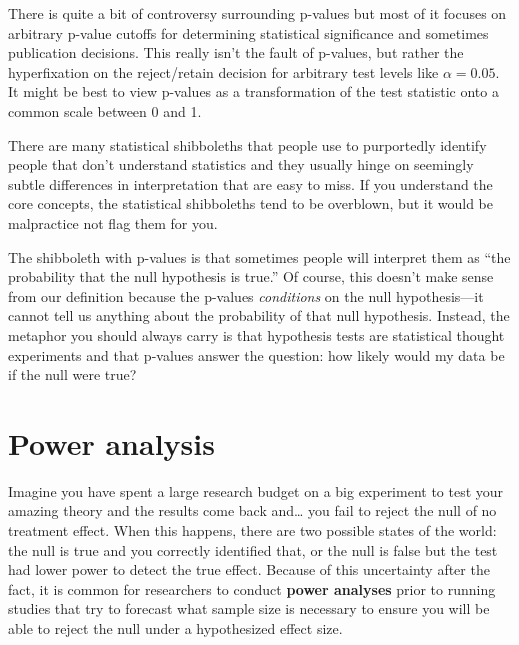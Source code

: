 \documentclass[
  letterpaper,
  DIV=11,
  numbers=noendperiod]{scrreprt}
\theoremstyle{definition}
\theoremstyle{plain}
\theoremstyle{definition}
\theoremstyle{remark}
\begin{document}
There is quite a bit of controversy surrounding p-values but most of it
focuses on arbitrary p-value cutoffs for determining statistical
significance and sometimes publication decisions. This really isn't the
fault of p-values, but rather the hyperfixation on the reject/retain
decision for arbitrary test levels like \(\alpha = 0.05\). It might be
best to view p-values as a transformation of the test statistic onto a
common scale between 0 and 1.

\begin{tcolorbox}[enhanced jigsaw, title=\textcolor{quarto-callout-warning-color}{\faExclamationTriangle}\hspace{0.5em}{Warning}, breakable, titlerule=0mm, opacityback=0, rightrule=.15mm, bottomrule=.15mm, colframe=quarto-callout-warning-color-frame, coltitle=black, colbacktitle=quarto-callout-warning-color!10!white, bottomtitle=1mm, toptitle=1mm, colback=white, arc=.35mm, opacitybacktitle=0.6, toprule=.15mm, leftrule=.75mm, left=2mm]

There are many statistical shibboleths that people use to purportedly
identify people that don't understand statistics and they usually hinge
on seemingly subtle differences in interpretation that are easy to miss.
If you understand the core concepts, the statistical shibboleths tend to
be overblown, but it would be malpractice not flag them for you.

The shibboleth with p-values is that sometimes people will interpret
them as ``the probability that the null hypothesis is true.'' Of course,
this doesn't make sense from our definition because the p-values
\emph{conditions} on the null hypothesis---it cannot tell us anything
about the probability of that null hypothesis. Instead, the metaphor you
should always carry is that hypothesis tests are statistical thought
experiments and that p-values answer the question: how likely would my
data be if the null were true?

\end{tcolorbox}

\hypertarget{power-analysis}{%
\section{Power analysis}\label{power-analysis}}

Imagine you have spent a large research budget on a big experiment to
test your amazing theory and the results come back and\ldots{} you fail
to reject the null of no treatment effect. When this happens, there are
two possible states of the world: the null is true and you correctly
identified that, or the null is false but the test had lower power to
detect the true effect. Because of this uncertainty after the fact, it
is common for researchers to conduct \textbf{power analyses} prior to
running studies that try to forecast what sample size is necessary to
ensure you will be able to reject the null under a hypothesized effect
size.
\end{document}

